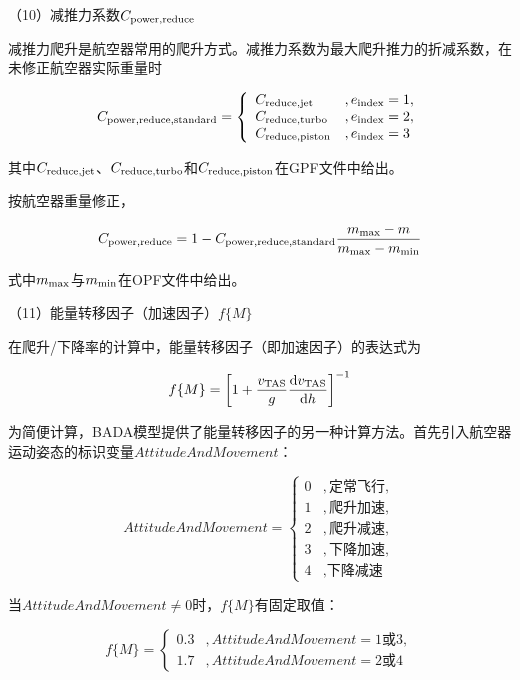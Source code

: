 \documentclass[a4paper,punct,space,heading=true,AutoFakeBold]{ctexrep}
\begin{document}
（10）减推力系数$C_{\rm power,reduce}$

减推力爬升是航空器常用的爬升方式。减推力系数为最大爬升推力的折减系数，在未修正航空器实际重量时

\begin{equation}
C_{\rm power,reduce,standard}=\left\{\begin{array}{ll}
C_{\rm reduce,jet}   &   , e_{\rm index}=1,\\        
C_{\rm reduce,turbo}   &   , e_{\rm index}=2,\\     
C_{\rm reduce,piston}   &   , e_{\rm index}=3
\end{array}\right.
\end{equation}

其中$C_{\rm reduce,jet}$、$C_{\rm reduce,turbo}$和$C_{\rm reduce,piston}$在GPF文件中给出。

按航空器重量修正，

\begin{equation}
C_{\rm power,reduce}=1-C_{\rm power,reduce,standard}\frac{m_{\rm max}-m}{m_{\rm max}-m_{\rm min}}
\end{equation}

式中$m_{\rm max}$与$m_{\rm min}$在OPF文件中给出。

（11）能量转移因子（加速因子）$f\{M\}$

在爬升/下降率的计算中，能量转移因子（即加速因子）的表达式为

\begin{equation}
f\{M\}=\left[1+\frac{v_{\rm TAS}}{g}\frac{{\rm d}v_{\rm TAS}}{{\rm d}h}\right]^{-1}
\end{equation}

为简便计算，BADA模型提供了能量转移因子的另一种计算方法。首先引入航空器运动姿态的标识变量$AttitudeAndMovement$：

\begin{equation}
AttitudeAndMovement=\left\{\begin{array}{ll}
0   &   , \text{定常飞行},\\        
1   &   , \text{爬升加速},\\     
2   &   , \text{爬升减速},\\     
3   &   , \text{下降加速},\\     
4   &   , \text{下降减速}
\end{array}\right.
\end{equation}

当$AttitudeAndMovement\neq 0$时，$f\{M\}$有固定取值：

\begin{equation}
f\{M\}=\left\{\begin{array}{ll}
0.3   &   , AttitudeAndMovement=1\text{或}3,\\        
1.7   &   , AttitudeAndMovement=2\text{或}4
\end{array}\right.
\end{equation}
\end{document}
